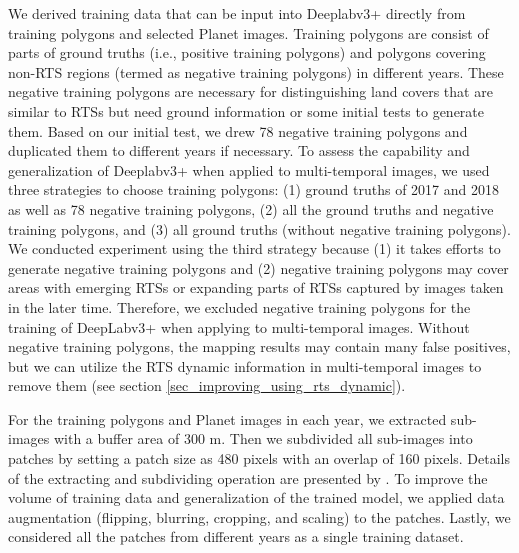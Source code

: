 \documentclass[authoryear,preprint,review,12pt]{elsarticle}
\begin{document}
We derived training data that can be input into Deeplabv3+ directly from training polygons and selected Planet images.
Training polygons are consist of parts of ground truths (i.e., positive training polygons) and polygons covering non-RTS regions (termed as negative training polygons) in different years.
These negative training polygons are necessary for distinguishing land covers that are similar to RTSs but need ground information or some initial tests to generate them. 
Based on our initial test, we drew 78 negative training polygons and duplicated them to different years if necessary.  
To assess the capability and generalization of Deeplabv3+ when applied to multi-temporal images, we used three strategies to choose training polygons: (1) ground truths of 2017 and 2018 as well as 78 negative training polygons, (2) all the ground truths and negative training polygons, and (3) all ground truths (without negative training polygons). 
We conducted experiment using the third strategy because (1) it takes efforts to generate negative training polygons and (2) negative training polygons may cover areas with emerging RTSs or expanding parts of RTSs captured by images taken in the later time. 
Therefore, we excluded negative training polygons for the training of DeepLabv3+ when applying to multi-temporal images.
Without negative training polygons, the mapping results may contain many false positives, but we can utilize the RTS dynamic information in multi-temporal images to remove them (see section \ref{sec_improving_using_rts_dynamic}).


For the training polygons and Planet images in each year, we extracted sub-images with a buffer area of 300 m. 
Then we subdivided all sub-images into patches by setting a patch size as 480 pixels with an overlap of 160 pixels. 
Details of the extracting and subdividing operation are presented by \cite{huang2018automatic}.
To improve the volume of training data and generalization of the trained model, we applied data augmentation (flipping, blurring, cropping, and scaling) to the patches. 
Lastly, we considered all the patches from different years as a single training dataset. 


\end{document}
